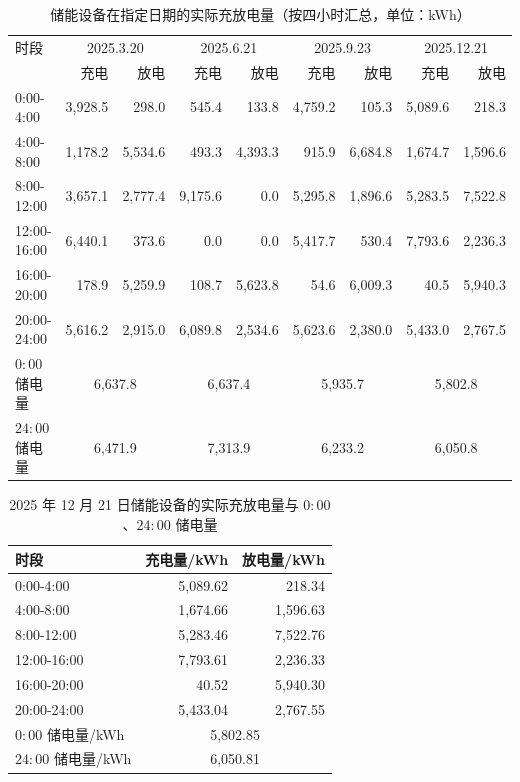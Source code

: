 \begin{table}[htbp]
  \centering
  \caption{储能设备在指定日期的实际充放电量（按四小时汇总，单位：kWh）}
  \label{tab:p3-storage}
  \footnotesize
  \begin{tabular}{lrrrrrrrr}
    \toprule
    时段 & \multicolumn{2}{c}{2025.3.20} & \multicolumn{2}{c}{2025.6.21} & \multicolumn{2}{c}{2025.9.23} & \multicolumn{2}{c}{2025.12.21} \\
     & 充电 & 放电 & 充电 & 放电 & 充电 & 放电 & 充电 & 放电 \\
    \midrule
    0{:}00-4{:}00 & 3,928.5 & 298.0 & 545.4 & 133.8 & 4,759.2 & 105.3 & 5,089.6 & 218.3 \\
    4{:}00-8{:}00 & 1,178.2 & 5,534.6 & 493.3 & 4,393.3 & 915.9 & 6,684.8 & 1,674.7 & 1,596.6 \\
    8{:}00-12{:}00 & 3,657.1 & 2,777.4 & 9,175.6 & 0.0 & 5,295.8 & 1,896.6 & 5,283.5 & 7,522.8 \\
    12{:}00-16{:}00 & 6,440.1 & 373.6 & 0.0 & 0.0 & 5,417.7 & 530.4 & 7,793.6 & 2,236.3 \\
    16{:}00-20{:}00 & 178.9 & 5,259.9 & 108.7 & 5,623.8 & 54.6 & 6,009.3 & 40.5 & 5,940.3 \\
    20{:}00-24{:}00 & 5,616.2 & 2,915.0 & 6,089.8 & 2,534.6 & 5,623.6 & 2,380.0 & 5,433.0 & 2,767.5 \\
    \midrule
    $0{:}00$ 储电量 & \multicolumn{2}{c}{6,637.8} & \multicolumn{2}{c}{6,637.4} & \multicolumn{2}{c}{5,935.7} & \multicolumn{2}{c}{5,802.8} \\
    $24{:}00$ 储电量 & \multicolumn{2}{c}{6,471.9} & \multicolumn{2}{c}{7,313.9} & \multicolumn{2}{c}{6,233.2} & \multicolumn{2}{c}{6,050.8} \\
    \bottomrule
  \end{tabular}
\end{table}

\begin{table}[htbp]
  \centering
  \caption{2025 年 12 月 21 日储能设备的实际充放电量与 $0{:}00$、$24{:}00$ 储电量}
  \label{tab:p3-storage-dec}
  \small
  \begin{tabular}{lrr}
    \toprule
    时段 & 充电量/kWh & 放电量/kWh \\
    \midrule
    0{:}00-4{:}00 & 5,089.62 & 218.34 \\
    4{:}00-8{:}00 & 1,674.66 & 1,596.63 \\
    8{:}00-12{:}00 & 5,283.46 & 7,522.76 \\
    12{:}00-16{:}00 & 7,793.61 & 2,236.33 \\
    16{:}00-20{:}00 & 40.52 & 5,940.30 \\
    20{:}00-24{:}00 & 5,433.04 & 2,767.55 \\
    \midrule
    $0{:}00$ 储电量/kWh & \multicolumn{2}{c}{5,802.85} \\
    $24{:}00$ 储电量/kWh & \multicolumn{2}{c}{6,050.81} \\
    \bottomrule
  \end{tabular}
\end{table}

